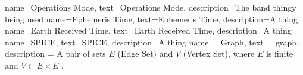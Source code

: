 {
    name={Operations Mode},
    text={Operations Mode},
    description={The band thingy being used}
}
{
    name={Ephemeris Time},
    text={Ephemeris Time},
    description={A thing}
}
{
    name={Earth Received Time},
    text={Earth Received Time},
    description={A thing}
}
{
    name={SPICE},
    text={SPICE},
    description={A thing}
}
{
    name = {Graph},
    text = {graph},
    description = {
        A pair of sets $E$ (Edge Set) and $V$ (Vertex Set), where $E$ is finite
        and $V\subset E\times E$
    },
}